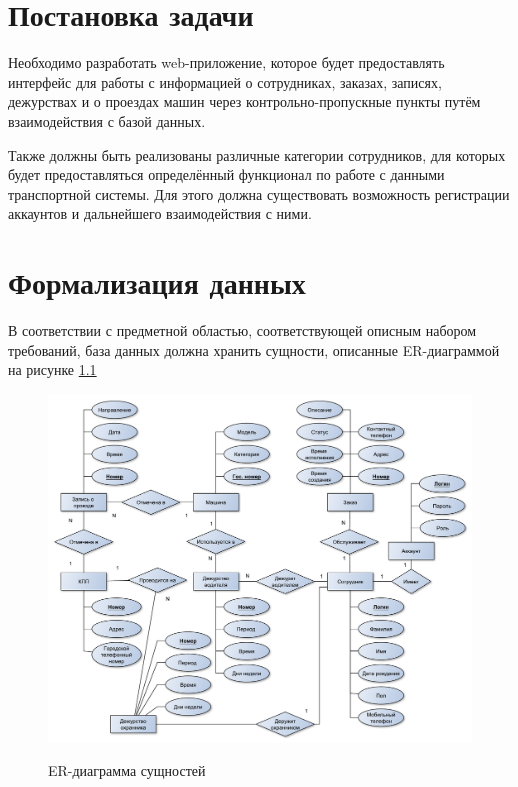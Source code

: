 \section{Постановка задачи}
Необходимо разработать web-приложение, которое будет предоставлять интерфейс для работы с информацией о сотрудниках, заказах, записях, дежурствах и о проездах машин через контрольно-пропускные пункты путём взаимодействия с базой данных.

Также должны быть реализованы различные категории сотрудников, для которых будет предоставляться определённый функционал по работе с данными транспортной системы. Для этого должна существовать возможность регистрации аккаунтов и дальнейшего взаимодействия с ними.

\newpage
\section{Формализация данных}
В соответствии с предметной областью, соответствующей описным набором требований, база данных должна хранить сущности, описанные ER-диаграммой на рисунке \hyperref[er_analitics]{1.1}


\begin{figure}[ph!] \label{er_analitics}
	\begin{center}
		{\includegraphics[scale=0.4]{schemes/er.pdf}}
		\caption{ER-диаграмма сущностей}
	\end{center}
\end{figure}

